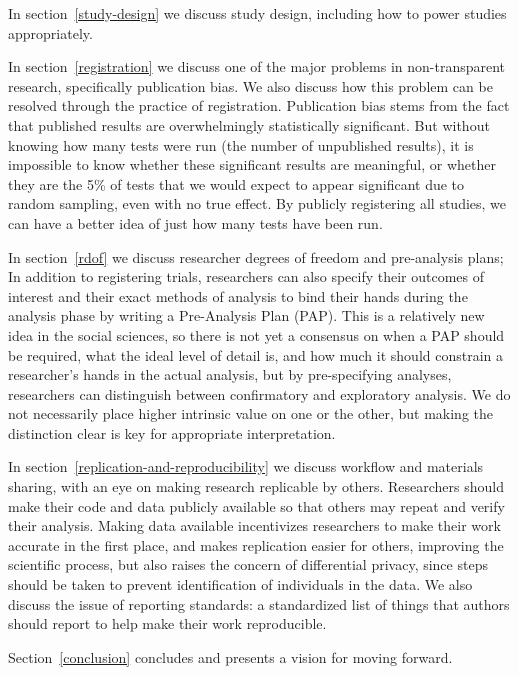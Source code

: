 \documentclass[12pt] {article}
\begin{document}
In section~\ref{study-design} we discuss study design, including how to power studies
appropriately.

In section~\ref{registration} we discuss one of the major problems in non-transparent
research, specifically publication bias. We also discuss how this
problem can be resolved through the practice of registration.
Publication bias stems from the fact that published results are
overwhelmingly statistically significant. But without knowing how many
tests were run (the number of unpublished results), it is impossible to know whether these significant
results are meaningful, or whether they are the 5\% of tests that we
would expect to appear significant due to random sampling, even with no
true effect. By publicly registering all studies, we can have a better
idea of just how many tests have been run.

In section~\ref{rdof} we discuss researcher degrees of freedom and pre-analysis
plans; In addition to registering trials, researchers can also
specify their outcomes of interest and their exact methods of analysis
to bind their hands during the analysis phase by writing a Pre-Analysis
Plan (PAP). This is a relatively new idea in the social sciences, so
there is not yet a consensus on when a PAP should be required, what the
ideal level of detail is, and how much it should constrain a
researcher's hands in the actual analysis, but by pre-specifying analyses,
researchers can distinguish between confirmatory and exploratory
analysis. We do not necessarily place higher intrinsic value on one or
the other, but making the distinction clear is key for appropriate
interpretation.

In section~\ref{replication-and-reproducibility} we discuss workflow and materials sharing, with an eye on
making research replicable by others. Researchers should make their code
and data publicly available so that others may repeat and verify their
analysis. Making data available incentivizes researchers to make their
work accurate in the first place, and makes replication easier for
others, improving the scientific process, but also raises the concern of
differential privacy, since steps should be taken to prevent
identification of individuals in the data. We also discuss the issue of
reporting standards: a standardized list of things that authors should
report to help make their work reproducible.

Section~\ref{conclusion} concludes and presents a vision for moving forward.

\end{document}
